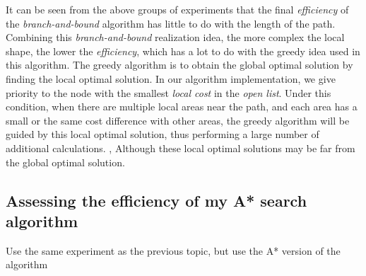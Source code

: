 \documentclass[
]{article}
\begin{document}
It can be seen from the above groups of experiments that the final
\emph{efficiency} of the \emph{branch-and-bound} algorithm has little to
do with the length of the path. Combining this \emph{branch-and-bound}
realization idea, the more complex the local shape, the lower the
\emph{efficiency}, which has a lot to do with the greedy idea used in
this algorithm. The greedy algorithm is to obtain the global optimal
solution by finding the local optimal solution. In our algorithm
implementation, we give priority to the node with the smallest
\emph{local cost} in the \emph{open list}. Under this condition, when
there are multiple local areas near the path, and each area has a small
or the same cost difference with other areas, the greedy algorithm will
be guided by this local optimal solution, thus performing a large number
of additional calculations. , Although these local optimal solutions may
be far from the global optimal solution.

\subsection{Assessing the efficiency of my A* search algorithm}

Use the same experiment as the previous topic, but use the A* version of
the algorithm
\end{document}
